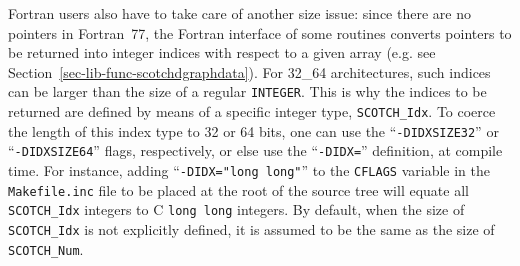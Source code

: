 Fortran users also have to take care of another size issue: since
there are no pointers in Fortran~77, the Fortran interface of some
routines converts pointers to be returned into integer indices with
respect to a given array (e.g. see
Section~\ref{sec-lib-func-scotchdgraphdata}).
For 32\_64 architectures, such indices can be larger than the size of
a regular {\tt INTEGER}. This is why the indices to be returned are
defined by means of a specific integer type, {\tt SCOTCH\_Idx}. To
coerce the length of this index type to 32 or 64 bits, one can use the
``{\tt -DIDXSIZE32}'' or ``{\tt -DIDXSIZE64}'' flags, respectively, or
else use the ``{\tt -DIDX=}'' definition, at compile time. For
instance, adding ``{\tt -DIDX="long~long"}'' to the {\tt CFLAGS}
variable in the {\tt Makefile.inc} file to be placed at the root of
the source tree will equate all {\tt SCOTCH\_\lbt Idx} integers to C
{\tt long long} integers. By default, when the size of
{\tt SCOTCH\_\lbt Idx} is not explicitly defined, it is assumed to be
the same as the size of {\tt SCOTCH\_\lbt Num}.
